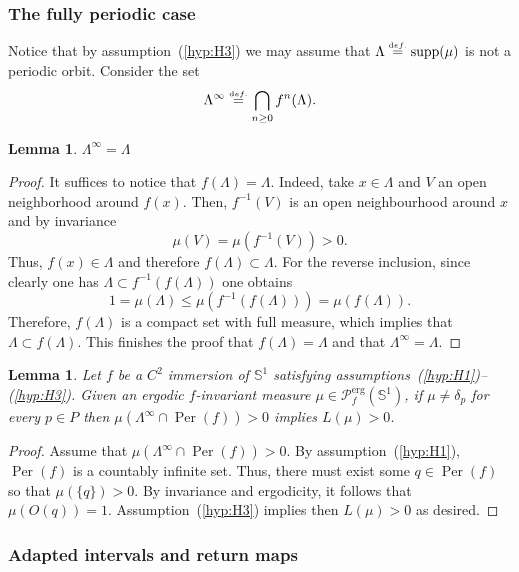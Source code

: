 \documentclass[12pt,a4paper,twoside]{article}
\theoremstyle{plain}
\newtheorem{lemma}[theorem]{Lemma}
\theoremstyle{definition}
\newcommand{\cP}{{\mathcal P}}
\newcommand{\per}{\operatorname{Per}(f)}
\newcommand{\eqdef}{\stackrel{\scriptscriptstyle\textrm def.}{=}}
\begin{document}
\subsubsection{The fully periodic case}    

Notice that by assumption~(\ref{hyp:H3}) we may assume that $\Lambda\eqdef\operatorname{supp}(\mu)$ is not a periodic orbit. Consider the set 
\[
\Lambda^{\infty}\eqdef\bigcap_{n\geq 0}f^n(\Lambda). 
\]
\begin{lemma}
    \label{lem:igualdadeinfinito}
$\Lambda^\infty=\Lambda$    
\end{lemma}
\begin{proof}
It suffices to notice that $f(\Lambda)=\Lambda$. Indeed, take $x\in\Lambda$ and $V$ an open neighborhood around  $f(x)$. Then, $f^{-1}(V)$ is an open neighbourhood around $x$ and by invariance
\[
\mu(V)=\mu(f^{-1}(V))>0.
\]
Thus, $f(x)\in\Lambda$ and therefore $f(\Lambda)\subset\Lambda$. For the reverse inclusion, since clearly one has $\Lambda\subset f^{-1}(f(\Lambda))$ one obtains
\[
1=\mu(\Lambda)\leq\mu(f^{-1}(f(\Lambda)))=\mu(f(\Lambda)).
\]
Therefore, $f(\Lambda)$ is a compact set with full measure, which implies that $\Lambda\subset f(\Lambda)$. This finishes the proof that $f(\Lambda)=\Lambda$ and that $\Lambda^\infty=\Lambda$. 
\end{proof}

\begin{lemma}
    \label{lem:expoenteperiodicopositivo}
Let $f$ be a $C^2$ immersion of $\mathbb{S}^1$ satisfying assumptions~\emph{(\ref{hyp:H1})--(\ref{hyp:H3})}. Given an ergodic $f$-invariant measure $\mu\in\cP_f^{\operatorname{erg}}(\mathbb{S}^1)$, if $\mu\neq\delta_p$ for every $p\in P$ then $\mu\left(\Lambda^{\infty}\cap\per\right)>0$ implies $L(\mu)>0$.
\end{lemma}
\begin{proof}
Assume that $\mu\left(\Lambda^{\infty}\cap\per\right)>0$. By assumption~(\ref{hyp:H1}), $\per$ is a countably infinite set. Thus, there must exist some $q\in\per$ so that $\mu(\{q\})>0$. By invariance and ergodicity, it follows that $\mu(O(q))=1$. Assumption~(\ref{hyp:H3}) implies then $L(\mu)>0$ as desired.
\end{proof}

\subsubsection{Adapted intervals and return maps}
\end{document}
